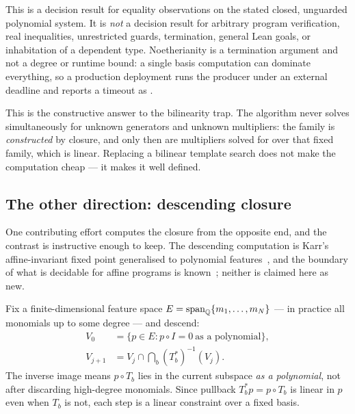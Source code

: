 \begin{remark}
This is a decision result for equality observations on the stated closed,
unguarded polynomial system. It is \emph{not} a decision result for arbitrary
program verification, real inequalities, unrestricted guards, termination,
general Lean goals, or inhabitation of a dependent type. Noetherianity is a
termination argument and not a degree or runtime bound: a single basis
computation can dominate everything, so a production deployment runs the
producer under an external deadline and reports a timeout as \unknown{}.
\end{remark}

This is the constructive answer to the bilinearity trap. The algorithm never
solves simultaneously for unknown generators and unknown multipliers: the
family is \emph{constructed} by closure, and only then are multipliers solved
for over that fixed family, which is linear. Replacing a bilinear template
search does not make the computation cheap --- it makes it well defined.

\subsection{The other direction: descending closure}
\label{sec:descending}

One contributing effort computes the closure from the opposite end, and the
contrast is instructive enough to keep. The descending computation is Karr's
affine-invariant fixed point generalised to polynomial features~\cite{karr},
and the boundary of what is decidable for affine programs is
known~\cite{affine-invariants}; neither is claimed here as new.

Fix a finite-dimensional feature space $E=\operatorname{span}_{\mathbb{Q}}\{m_1,\ldots,m_N\}$ ---
in practice all monomials up to some degree --- and descend:
\begin{align}
 V_0&=\{p\in E: p\circ I=0\ \text{as a polynomial}\},\label{eq:v0}\\
 V_{j+1}&=V_j\cap\bigcap_b (T_b^{*})^{-1}(V_j).\label{eq:vnext}
\end{align}
The inverse image means $p\circ T_b$ lies in the current subspace \emph{as a
polynomial}, not after discarding high-degree monomials. Since pullback
$T^{*}_bp=p\circ T_b$ is linear in $p$ even when $T_b$ is not, each step is a
linear constraint over a fixed basis.

